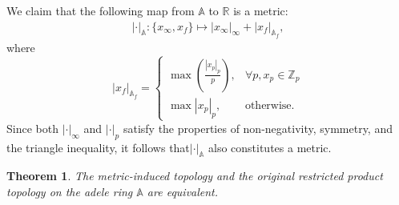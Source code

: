 \documentclass[11pt]{article}
\newtheorem{theorem}{Theorem}[section]  %
\newcommand{\A}{\mathbb{A}}
\theoremstyle{remark}
\begin{document}
We claim that the following map from $\A$ to $\mathbb{R}$ is a metric:
\begin{align}
    \lvert\cdot\rvert_{\A}:\{x_\infty,x_f\}\mapsto \lvert x_\infty\rvert_{\infty}+\lvert x_f\rvert_{\A_f},
\end{align}
where
\[
|x_f|_{\A_f} = 
\begin{cases} 
\max \left( \frac{|x_p|_p}{p} \right), & \forall p, x_p \in \mathbb{Z}_p \\
\max |x_p|_p, & \text{otherwise}.
\end{cases}
\]
Since both $\lvert\cdot\rvert_\infty$ and $\lvert\cdot\rvert_{p}$ satisfy the properties of non-negativity, symmetry, and the triangle inequality, it follows that\(\lvert\cdot\rvert_{\A}\) also constitutes a metric. 
\begin{theorem}
    The metric-induced topology and the original restricted product topology on the adele ring $\A$ are equivalent.


\end{theorem}
\end{document}

